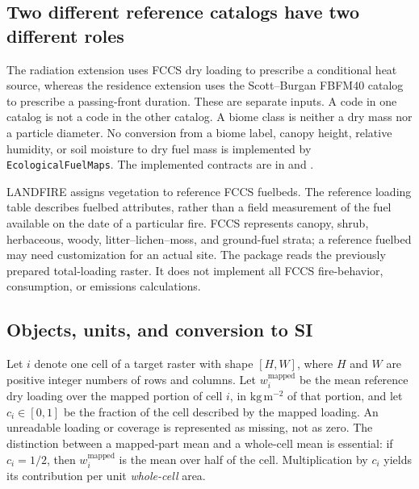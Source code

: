 \documentclass[11pt,a4paper]{article}
\begin{document}
\subsection{Two different reference catalogs have two different roles}

The radiation extension uses FCCS dry loading to prescribe a conditional heat
source, whereas the residence extension uses the Scott--Burgan FBFM40 catalog
to prescribe a passing-front duration. These are separate inputs. A code in one
catalog is not a code in the other catalog. A biome class is neither a dry mass
nor a particle diameter. No conversion from a biome label, canopy height,
relative humidity, or soil moisture to dry fuel mass is implemented by
\texttt{EcologicalFuelMaps}. The implemented contracts are in
 and
.\cite{coderesidence}

LANDFIRE assigns vegetation to reference FCCS fuelbeds. The reference loading
table describes fuelbed attributes, rather than a field measurement of the
fuel available on the date of a particular fire.\cite{landfirefccs}
FCCS represents canopy, shrub, herbaceous, woody, litter--lichen--moss, and
ground-fuel strata; a reference fuelbed may need customization for an actual
site.\cite{prichard2013} The package reads the previously prepared total-loading
raster. It does not implement all FCCS fire-behavior, consumption, or emissions
calculations.

\subsection{Objects, units, and conversion to SI}

Let $i$ denote one cell of a target raster with shape $[H,W]$, where $H$ and $W$
are positive integer numbers of rows and columns. Let
$w_i^{\mathrm{mapped}}$ be the mean reference dry loading over the mapped
portion of cell $i$, in $\mathrm{kg\,m^{-2}}$ of that portion, and let
$c_i\in[0,1]$ be the fraction of the cell described by the mapped loading.
An unreadable loading or coverage is represented as missing, not as zero.
The distinction between a mapped-part mean and a whole-cell mean is essential:
if $c_i=1/2$, then $w_i^{\mathrm{mapped}}$ is the mean over half of the cell.
Multiplication by $c_i$ yields its contribution per unit \emph{whole-cell} area.
\end{document}
